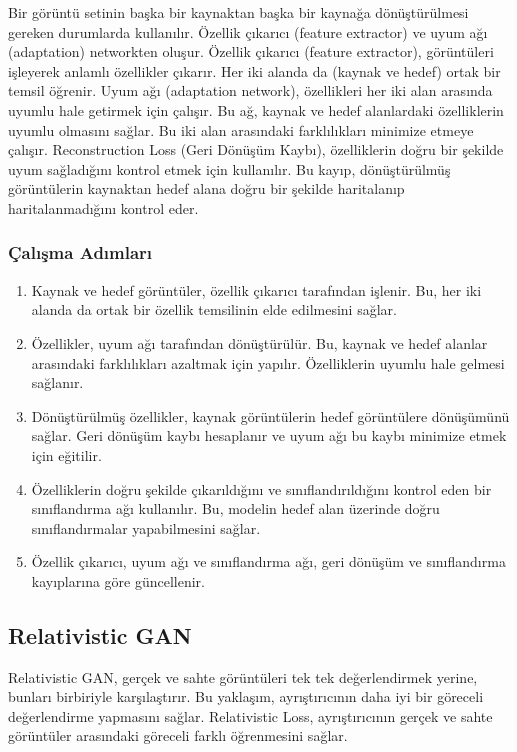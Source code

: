 Bir görüntü setinin başka bir kaynaktan başka bir kaynağa dönüştürülmesi gereken durumlarda kullanılır. Özellik çıkarıcı (feature extractor) ve uyum ağı (adaptation) networkten oluşur. Özellik çıkarıcı (feature extractor), görüntüleri işleyerek anlamlı özellikler çıkarır. Her iki alanda da (kaynak ve hedef) ortak bir temsil öğrenir. Uyum ağı (adaptation network), özellikleri her iki alan arasında uyumlu hale getirmek için çalışır. Bu ağ, kaynak ve hedef alanlardaki özelliklerin uyumlu olmasını sağlar. Bu iki alan arasındaki farklılıkları minimize etmeye çalışır.  Reconstruction Loss (Geri Dönüşüm Kaybı), özelliklerin doğru bir şekilde uyum sağladığını kontrol etmek için kullanılır. Bu kayıp, dönüştürülmüş görüntülerin kaynaktan hedef alana doğru bir şekilde haritalanıp haritalanmadığını kontrol eder. 

\subsubsection{Çalışma Adımları}

\begin{enumerate}
    \item Kaynak ve hedef görüntüler, özellik çıkarıcı tarafından işlenir. Bu, her iki alanda da ortak bir özellik temsilinin elde edilmesini sağlar.
    \item Özellikler, uyum ağı tarafından dönüştürülür. Bu, kaynak ve hedef alanlar arasındaki farklılıkları azaltmak için yapılır. Özelliklerin uyumlu hale gelmesi sağlanır.
    \item Dönüştürülmüş özellikler, kaynak görüntülerin hedef görüntülere dönüşümünü sağlar. Geri dönüşüm kaybı hesaplanır ve uyum ağı bu kaybı minimize etmek için eğitilir.
    \item Özelliklerin doğru şekilde çıkarıldığını ve sınıflandırıldığını kontrol eden bir sınıflandırma ağı kullanılır. Bu, modelin hedef alan üzerinde doğru sınıflandırmalar yapabilmesini sağlar.
    \item Özellik çıkarıcı, uyum ağı ve sınıflandırma ağı, geri dönüşüm ve sınıflandırma kayıplarına göre güncellenir.
\end{enumerate}

\newpage

\subsection{Relativistic GAN}

Relativistic GAN, gerçek ve sahte görüntüleri tek tek değerlendirmek yerine, bunları birbiriyle karşılaştırır. Bu yaklaşım, ayrıştırıcının daha iyi bir göreceli değerlendirme yapmasını sağlar. Relativistic Loss, ayrıştırıcının gerçek ve sahte görüntüler arasındaki göreceli farklı öğrenmesini sağlar.

